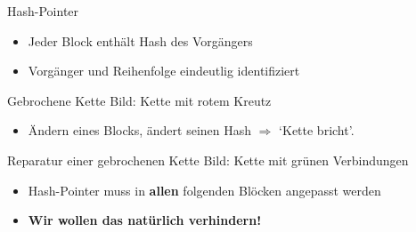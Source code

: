 \documentclass[aspectratio=169]{beamer}
\begin{document}
\begin{frame}{Hash-Pointer}
    \begin{center}
        \hspace{1cm}
        \hspace{1cm}
    \end{center}
    \begin{itemize}
        \item Jeder Block enthält Hash des Vorgängers
        \item Vorgänger und Reihenfolge eindeutlig identifiziert
    \end{itemize}
\end{frame}


\begin{frame}{Gebrochene Kette}
    Bild: Kette mit rotem Kreutz
    \begin{itemize}
        \item Ändern eines Blocks, ändert seinen Hash $\Rightarrow$ `Kette bricht'.
    \end{itemize}
\end{frame}


\begin{frame}{Reparatur einer gebrochenen Kette}
    Bild: Kette mit grünen Verbindungen
    \begin{itemize}
        \item Hash-Pointer muss in \textbf{allen} folgenden Blöcken angepasst werden
        \pause
        \item \textbf{Wir wollen das natürlich verhindern!}
    \end{itemize}
\end{frame}
\end{document}
